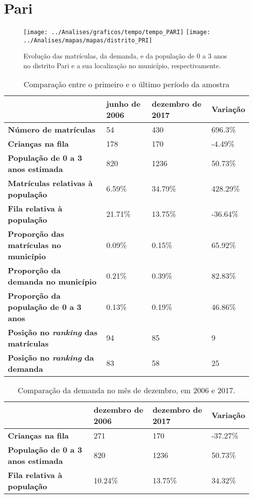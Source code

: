 \section{Pari}
\begin{figure}[H]
	\centering
	\texttt{[image: ../Analises/graficos/tempo/tempo\_PARI]}
	\texttt{[image: ../Analises/mapas/mapas/distrito\_PRI]}
	\caption{Evolução das matrículas, da demanda, e da população de 0 a 3 anos no distrito Pari e a sua localização no município, respectivamente.}
\end{figure}
\begin{table}[H]
	\begin{tabular}{|l|l|l|l|}
		\hline
		\textbf{}                                      & \textbf{junho de 2006}       & \textbf{dezembro de 2017}    & \textbf{Variação} \\ \hline
		\textbf{Número de matrículas}                  & 54 & 430 & 696.3\% \\ \hline
		\textbf{Crianças na fila}                      & 178 & 170 & -4.49\% \\ \hline
		\textbf{População de 0 a 3 anos estimada}      & 820 & 1236 & 50.73\% \\ \hline
		\textbf{Matrículas relativas à população}      & 6.59\% & 34.79\% & 428.29\% \\ \hline
		\textbf{Fila relativa à população}             & 21.71\% & 13.75\% & -36.64\% \\ \hline
		\textbf{Proporção das matrículas no município} & 0.09\% & 0.15\% & 65.92\% \\ \hline
		\textbf{Proporção da demanda no município}     & 0.21\% & 0.39\% & 82.83\% \\ \hline
		\textbf{Proporção da população de 0 a 3 anos}  & 0.13\% & 0.19\% & 46.86\% \\ \hline
		\textbf{Posição no \textit{ranking} das matrículas}     & 94 & 85 & 9 \\ \hline
		\textbf{Posição no \textit{ranking} da demanda}         & 83 & 58 & 25 \\ \hline
	\end{tabular}
	\caption{Comparação entre o primeiro e o último período da amostra}
\end{table}
\begin{table}[H]
	\begin{tabular}{|l|l|l|l|}
		\hline
		\textbf{}                                 & \textbf{dezembro de 2006} & \textbf{dezembro de 2017} & \textbf{Variação} \\ \hline
		\textbf{Crianças na fila}                      & 271 & 170 & -37.27\% \\ \hline
		\textbf{População de 0 a 3 anos estimada}      & 820 & 1236 & 50.73\% \\ \hline
		\textbf{Fila relativa à população}             & 10.24\% & 13.75\% & 34.32\% \\ \hline
	\end{tabular}
	\caption{Comparação da demanda no mês de dezembro, em 2006 e 2017.}
\end{table}

